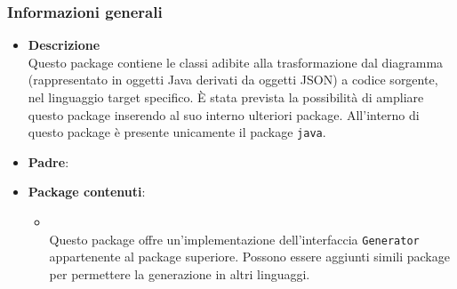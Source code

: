 \subsubsection{Informazioni generali}
\begin{itemize}
\item \textbf{Descrizione}\\
Questo package contiene le classi adibite alla trasformazione dal diagramma (rappresentato in oggetti Java derivati da oggetti JSON) a codice sorgente, nel linguaggio target specifico. È stata prevista la possibilità di ampliare questo package inserendo al suo interno ulteriori package. All'interno di questo package è presente unicamente il package \texttt{java}.
\item \textbf{Padre}: \hyperref[\nogloxy{swedesigner::server}]{}
\item \textbf{Package contenuti}:
\begin{itemize}
\item \hyperref[\nogloxy{swedesigner::server::generator::java}]{}\\
Questo package offre un'implementazione dell'interfaccia \texttt{Generator} appartenente al package superiore. Possono essere aggiunti simili package per permettere la generazione in altri linguaggi.
\end{itemize}
\end{itemize}
